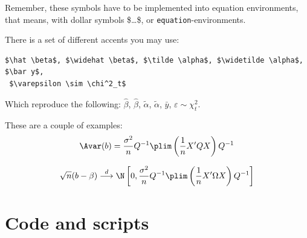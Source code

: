 \documentclass[12pt]{article}
\begin{document}
Remember, these symbols have to be implemented into equation  environments, that means, with dollar symbols \$\ldots\$, or \texttt{equation}-environments.

\newpage 

There is a set of different accents you may use:
\begin{Verbatim}[frame=single, fontsize=\footnotesize]
 $\hat \beta$, $\widehat \beta$, $\tilde \alpha$, $\widetilde \alpha$, $\bar y$, 
 $\varepsilon \sim \chi^2_t$
\end{Verbatim}
Which reproduce the following: $\hat \beta$, $\widehat \beta$, $\tilde \alpha$, $\widetilde \alpha$, $\bar y$, $\varepsilon \sim \chi^2_t$.

These are a couple of examples:
\begin{equation}
    \Avar (b) = \frac{\sigma^2}{n} Q^{-1} \plim \left( \frac{1}{n}X'QX \right)Q^{-1}
\end{equation}

\begin{equation}
    \sqrt{n}(b-\beta) \stackrel{d}{\longrightarrow} \N \left[0,\frac{\sigma^2}{n} Q^{-1} \plim \left( \frac{1}{n}X'\Omega X\right)Q^{-1}\right]
\end{equation}



\section*{Code and scripts}
\end{document}

